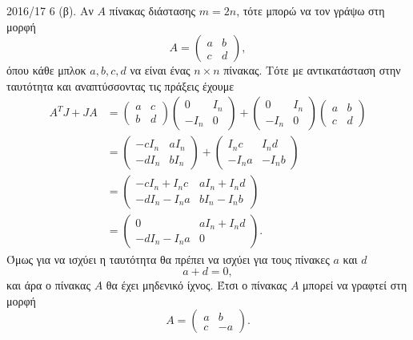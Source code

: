 \begin{solution}{2016/17 6}
    (β). Αν \( A \) πίνακας διάστασης \( m = 2n \), τότε μπορώ να τον γράψω στη
    μορφή
    \[
        A =
        \begin{pmatrix}
            a & b \\
            c & d
        \end{pmatrix},
    \]
    όπου κάθε μπλοκ \( a, b, c, d \) να είναι ένας \( n \times n \) πίνακας.
    Τότε με αντικατάσταση στην ταυτότητα και αναπτύσσοντας τις πράξεις έχουμε
    \begin{align*}
        A^{T}J + JA &=
        \begin{pmatrix}
            a & c \\
            b & d
        \end{pmatrix}
        \begin{pmatrix}
            0 & I_n \\
            -I_n & 0
        \end{pmatrix} +
        \begin{pmatrix}
            0 & I_n \\
            -I_n & 0
        \end{pmatrix}
        \begin{pmatrix}
            a & b \\
            c & d
        \end{pmatrix} \\
        &=\begin{pmatrix}
            -cI_n & aI_n \\
            -dI_n & bI_n
        \end{pmatrix} +
        \begin{pmatrix}
            I_{n}c & I_{n}d \\
            -I_{n}a & -I_{n}b
        \end{pmatrix}\\
        &=\begin{pmatrix}
            -cI_n + I_{n}c & aI_n + I_{n}d\\
            -dI_n - I_{n}a & bI_n -I_{n}b
        \end{pmatrix} \\
        &=\begin{pmatrix}
            0 & aI_n + I_{n}d\\
            -dI_n - I_{n}a & 0
        \end{pmatrix}.
    \end{align*}
    Όμως για να ισχύει η ταυτότητα θα πρέπει να ισχύει για τους πίνακες
    \( a \) και \( d \)
    \[
        a + d = 0,
    \]
    και άρα ο πίνακας \( A \) θα έχει μηδενικό ίχνος. Έτσι ο πίνακας \( A \)
    μπορεί να γραφτεί στη μορφή
    \[
        A =
        \begin{pmatrix}
            a & b \\
            c & -a
        \end{pmatrix}.
    \]


\end{solution}
